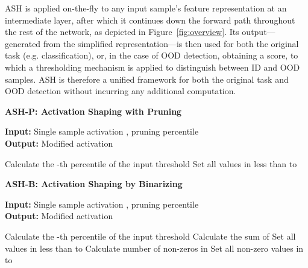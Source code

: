 \documentclass{article}
\newcommand{\figref}[1]{Figure~\ref{fig:#1}}
\newcommand{\alglabel}[1]{\label{alg:#1}}
\newcommand{\ac}{ASH\xspace}
\begin{document}
\ac is applied on-the-fly to any input sample's feature representation at an intermediate layer, after which it continues down the forward path throughout the rest of the network, as depicted in \figref{overview}. Its output---generated from the simplified representation---is then used for both the original task (e.g. classification), or, in the case of OOD detection, obtaining a score, to which a thresholding mechanism is applied to distinguish between ID and OOD samples. \ac is therefore a unified framework for both the original task and OOD detection without incurring any additional computation.

\begin{minipage}{0.3\textwidth}
    \begin{algorithm}[H]
    \small
    	\caption{\textbf{\textcolor{ashpcolor}{ASH-P: Activation Shaping with Pruning}}}
\textbf{Input:} Single sample activation , pruning percentile \\
        \textbf{Output:} Modified activation \\
        \begin{algorithmic}[1]
            \STATE Calculate the -th percentile of the input   threshold 
            \vspace{0.35cm}
            \STATE Set all values in  less than  to 
          	\vspace{1.05cm}
            \RETURN 
        \end{algorithmic}
    	\alglabel{ash-p}
    \end{algorithm} 
\end{minipage}
\hfill
\begin{minipage}{0.34\textwidth}
    \begin{algorithm}[H]
    \small
    	\caption{\textbf{\textcolor{ashbcolor}{ASH-B: Activation Shaping by Binarizing}}}
\textbf{Input:} Single sample activation , pruning percentile \\
        \textbf{Output:} Modified activation \\
        \begin{algorithmic}[1]
            \STATE Calculate the -th percentile of the input   threshold 
            \STATE Calculate the sum of   
            \STATE Set all values in  less than  to 
            \STATE Calculate number of non-zeros in   
            \STATE Set all non-zero values in  to 
            \RETURN 
        \end{algorithmic}
    	\alglabel{ash-b}
    \end{algorithm} 
\end{minipage}
\end{document}
